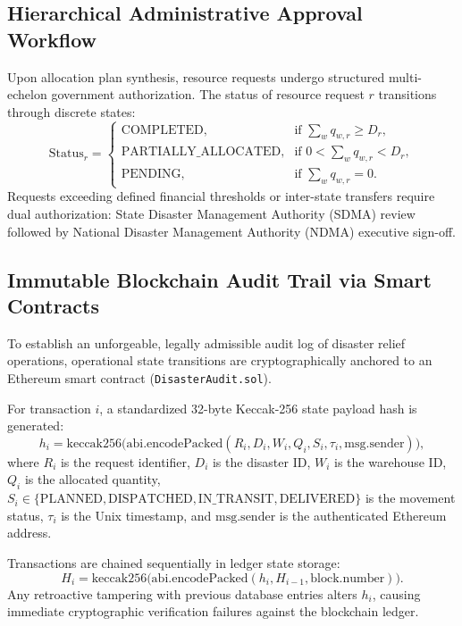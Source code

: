 \documentclass[conference]{IEEEtran}
\begin{document}
\subsection{Hierarchical Administrative Approval Workflow}
Upon allocation plan synthesis, resource requests undergo structured multi-echelon government authorization. The status of resource request $r$ transitions through discrete states:
\begin{equation}
\text{Status}_r = \begin{cases}
\text{COMPLETED}, & \text{if } \sum_w q_{w,r} \ge D_r, \\
\text{PARTIALLY\_ALLOCATED}, & \text{if } 0 < \sum_w q_{w,r} < D_r, \\
\text{PENDING}, & \text{if } \sum_w q_{w,r} = 0.
\end{cases}
\label{eq:status}
\end{equation}
Requests exceeding defined financial thresholds or inter-state transfers require dual authorization: State Disaster Management Authority (SDMA) review followed by National Disaster Management Authority (NDMA) executive sign-off.

\subsection{Immutable Blockchain Audit Trail via Smart Contracts}
To establish an unforgeable, legally admissible audit log of disaster relief operations, operational state transitions are cryptographically anchored to an Ethereum smart contract (\texttt{DisasterAudit.sol}).

For transaction $i$, a standardized 32-byte Keccak-256 state payload hash is generated:
\begin{equation}
h_i = \text{keccak256}\Big(\text{abi.encodePacked}(R_i, D_i, W_i, Q_i, S_i, \tau_i, \text{msg.sender})\Big),
\label{eq:keccak}
\end{equation}
where $R_i$ is the request identifier, $D_i$ is the disaster ID, $W_i$ is the warehouse ID, $Q_i$ is the allocated quantity, $S_i \in \{\text{PLANNED}, \text{DISPATCHED}, \text{IN\_TRANSIT}, \text{DELIVERED}\}$ is the movement status, $\tau_i$ is the Unix timestamp, and $\text{msg.sender}$ is the authenticated Ethereum address.

Transactions are chained sequentially in ledger state storage:
\begin{equation}
H_i = \text{keccak256}\Big(\text{abi.encodePacked}(h_i, H_{i-1}, \text{block.number})\Big).
\label{eq:chain_hash}
\end{equation}
Any retroactive tampering with previous database entries alters $h_i$, causing immediate cryptographic verification failures against the blockchain ledger.
\end{document}
